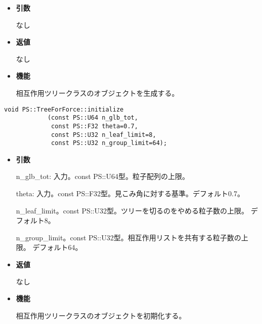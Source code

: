 \begin{itemize}

\item {\bf 引数}

なし

\item {\bf 返値}

なし

\item {\bf 機能}

相互作用ツリークラスのオブジェクトを生成する。

\end{itemize}


\begin{screen}
\begin{verbatim}
void PS::TreeForForce::initialize
            (const PS::U64 n_glb_tot,
             const PS::F32 theta=0.7,
             const PS::U32 n_leaf_limit=8,
             const PS::U32 n_group_limit=64);
\end{verbatim}
\end{screen}

\begin{itemize}

\item {\bf 引数}

n\_glb\_tot: 入力。const PS::U64型。粒子配列の上限。

theta: 入力。const PS::F32型。見こみ角に対する基準。デフォルト0.7。

n\_leaf\_limit。const PS::U32型。ツリーを切るのをやめる粒子数の上限。
デフォルト8。

n\_group\_limit。const PS::U32型。相互作用リストを共有する粒子数の上限。
デフォルト64。

\item {\bf 返値}

なし

\item {\bf 機能}

相互作用ツリークラスのオブジェクトを初期化する。

\end{itemize}



